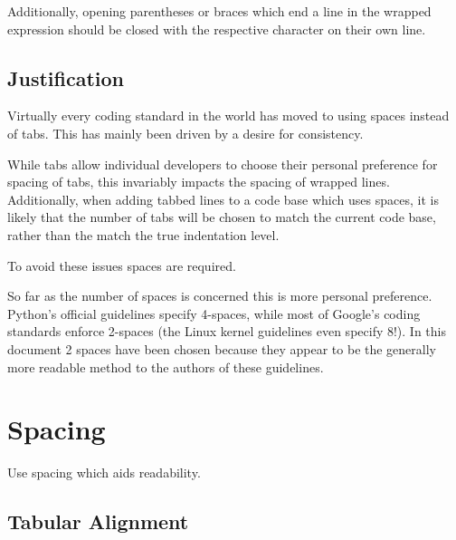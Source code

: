       Additionally, opening parentheses or braces which end a line in the wrapped expression should be closed with the respective character on their own line.

      \begin{goodbox}
        
      \end{goodbox}

    \subsection{Justification}
    \label{systemverilog_conventions:indentation:justification}

      Virtually every coding standard in the world has moved to using spaces instead of tabs.
      This has mainly been driven by a desire for consistency.

      While tabs allow individual developers to choose their personal preference for spacing of tabs,
        this invariably impacts the spacing of wrapped lines.
      Additionally, when adding tabbed lines to a code base which uses spaces, it is likely that the number of tabs
        will be chosen to match the current code base, rather than the match the true indentation level.

      To avoid these issues spaces are required.

      So far as the number of spaces is concerned this is more personal preference.
      Python's official guidelines specify 4-spaces, while most of Google's coding standards enforce 2-spaces (the Linux kernel guidelines even specify 8!).
      In this document 2 spaces have been chosen because they appear to be the generally more readable method to the authors of these guidelines.

  \section{Spacing}
  \label{systemverilog_conventions:spacing}

    \begin{keybox}
      Use spacing which aids readability.
    \end{keybox}

    \subsection{Tabular Alignment}
    \label{systemverilog_conventions:spacing:tabular_alignment}

